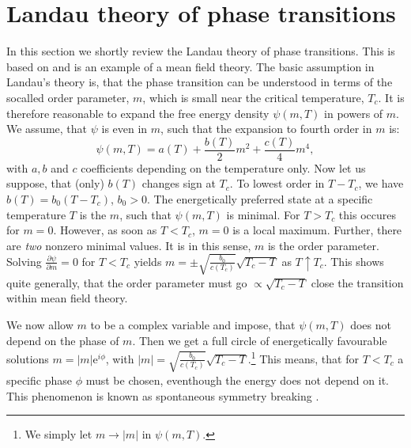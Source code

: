 \section{Landau theory of phase transitions}
\label{sec.landauphasetransitions}
In this section we shortly review the Landau theory of phase transitions. This is based on \cite[pp. 86-88]{PlischkeStatPhys} and is an example of a mean field theory. The basic assumption in Landau's theory is, that the phase transition can be understood in terms of the socalled order parameter, $m$, which is small near the critical temperature, $T_c$. It is therefore reasonable to expand the free energy density $\psi(m, T)$ in powers of $m$. We assume, that $\psi$ is even in $m$, such that the expansion to fourth order in $m$ is:
\begin{equation}
\psi(m, T) = a(T) + \frac{b(T)}{2}m^2 + \frac{c(T)}{4}m^4, 
\label{eq.freeenergydensity.mexpansion}
\end{equation}
with $a, b$ and $c$ coefficients depending on the temperature only. Now let us suppose, that (only) $b(T)$ changes sign at $T_c$. To lowest order in $T - T_c$, we have $b(T) = b_0 (T - T_c)$, $b_0 > 0$. The energetically preferred state at a specific temperature $T$ is the $m$, such that $\psi(m, T)$ is minimal. For $T > T_c$ this occures for $m = 0$. However, as soon as $T < T_c$, $m = 0$ is a local maximum. Further, there are \textit{two} nonzero minimal values. It is in this sense, $m$ is the order parameter. Solving $\frac{\partial \psi}{\partial m} = 0$ for $T < T_c$ yields $m = \pm \sqrt{\frac{b_0}{c(T_c)}}\sqrt{T_c-T}$ as $T \uparrow T_c$. This shows quite generally, that the order parameter must go $\propto \sqrt{T_c - T}$ close the transition within mean field theory.  

We now allow $m$ to be a complex variable and impose, that $\psi(m, T)$ does not depend on the phase of $m$. Then we get a full circle of energetically favourable solutions $m = |m| \text{e}^{i\phi}$, with $|m| = \sqrt{\frac{b_0}{c(T_c)}}\sqrt{T_c-T}$.\footnote{We simply let $m \to |m|$ in $\psi(m, T)$.} This means, that for $T < T_c$ a specific phase $\phi$ must be chosen, eventhough the energy does not depend on it. This phenomenon is known as spontaneous symmetry breaking \cite[pp. 72-74]{BruusFlensberg}. 

